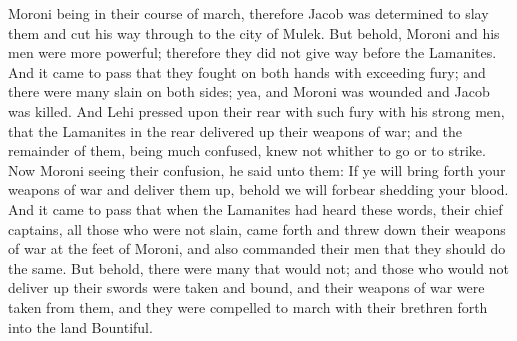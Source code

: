 \bverse \iffalse Moroni being in their course of march, therefore Jacob was determined to slay them and cut his way through to the city of Mulek. But behold, Moroni and his men were more powerful; therefore they did not give way before the Lamanites. \fi
Moroni being in their course of march, therefore Jacob was determined to slay them and cut his way through to the city of Mulek. But behold, Moroni and his men were more powerful; therefore they did not give way before the Lamanites.
\bverse \iffalse And it came to pass that they fought on both hands with exceeding fury; and there were many slain on both sides; yea, and Moroni was wounded and Jacob was killed. \fi
And it came to pass that they fought on both hands with exceeding fury; and there were many slain on both sides; yea, and Moroni was wounded and Jacob was killed.
\bverse \iffalse And Lehi pressed upon their rear with such fury with his strong men, that the Lamanites in the rear delivered up their weapons of war; and the remainder of them, being much confused, knew not whither to go or to strike. \fi
And Lehi pressed upon their rear with such fury with his strong men, that the Lamanites in the rear delivered up their weapons of war; and the remainder of them, being much confused, knew not whither to go or to strike.
\bverse \iffalse Now Moroni seeing their confusion, he said unto them: If ye will bring forth your weapons of war and deliver them up, behold we will forbear shedding your blood. \fi
Now Moroni seeing their confusion, he said unto them: If ye will bring forth your weapons of war and deliver them up, behold we will forbear shedding your blood.
\bverse \iffalse And it came to pass that when the Lamanites had heard these words, their chief captains, all those who were not slain, came forth and threw down their weapons of war at the feet of Moroni, and also commanded their men that they should do the same. \fi
And it came to pass that when the Lamanites had heard these words, their chief captains, all those who were not slain, came forth and threw down their weapons of war at the feet of Moroni, and also commanded their men that they should do the same.
\bverse \iffalse But behold, there were many that would not; and those who would not deliver up their swords were taken and bound, and their weapons of war were taken from them, and they were compelled to march with their brethren forth into the land Bountiful. \fi
But behold, there were many that would not; and those who would not deliver up their swords were taken and bound, and their weapons of war were taken from them, and they were compelled to march with their brethren forth into the land Bountiful.
